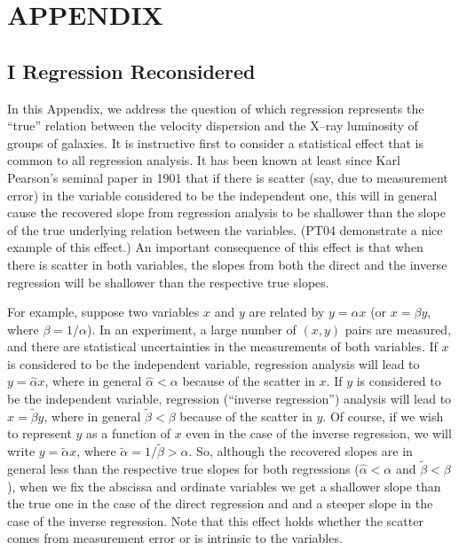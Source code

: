 \section*{APPENDIX}

\subsection*{I Regression Reconsidered}
\label{appendixI}

In this Appendix, we address the question of which regression represents the
``true'' relation between the velocity dispersion and the X--ray luminosity of
groups of galaxies.  It is instructive first to consider a statistical
effect that is common to all regression analysis.  It has been known at
least since Karl Pearson's seminal paper in 1901 that if there is scatter (say,
due to measurement error) in the variable considered to be the independent one,
this will in general cause the recovered slope from regression analysis to
be shallower than the slope of the true underlying relation between the
variables.  (PT04 demonstrate a nice example of this effect.) An
important consequence of this effect is that when there is scatter in both
variables, the slopes from both the direct and the inverse regression will
be shallower than the respective true slopes. 

For example, suppose two variables $x$ and $y$ are related by
$y = \alpha x$ (or $x = \beta y$, where $\beta = 1/\alpha$).  In an experiment,
a large number of $(x,y)$ pairs are measured, and there are statistical
uncertainties in the measurements of both variables.  If $x$ is considered
to be the independent variable, regression analysis will lead to
$y = \hat{\alpha} x$, where in general $\hat{\alpha} < \alpha$
because of the scatter in $x$.  If $y$ is considered to be the
independent variable, regression (``inverse regression'') analysis
will lead to $x = \tilde{\beta} y$, where in general $\tilde{\beta} < \beta$
because of the scatter in $y$.  Of course, if we wish to represent $y$ as
a function of $x$ even in the case of the inverse regression, we will write
$y = \tilde{\alpha} x$, where $\tilde{\alpha} = 1/\tilde{\beta} > \alpha$.
So, although the recovered slopes are in general less than the respective true
slopes for both regressions
($\hat{\alpha} < \alpha$ and $\tilde{\beta} < \beta$),
when we fix the abscissa and ordinate variables we get a shallower slope
than the true one in the case of the direct regression and and a steeper
slope in the case of the inverse regression.  Note that this effect holds
whether the scatter comes from measurement error or is intrinsic to the
variables.

